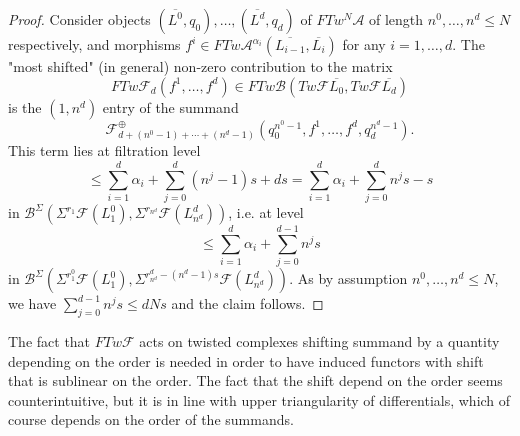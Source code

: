 \begin{proof}
	Consider objects $(\overline{L^0},q_0),\ldots, (\overline{L^d},q_d)$ of $FTw^N\mathcal{A}$ of length $n^0,\ldots, n^d\leq N$ respectively, and morphisms $f^i\in FTw\mathcal{A}^{\alpha_i}(\overline{L_{i-1}},\overline{L_i})$ for any $i=1,\ldots,d$. The "most shifted" (in general) non-zero contribution to the matrix $$FTw\mathcal{F}_d(f^1,\ldots, f^d)\in FTw\mathcal{B}(Tw\mathcal{F}\overline{L_0},Tw\mathcal{F}\overline{L_d})$$ is the $(1,n^d)$ entry of the summand $$\mathcal{F}^\oplus_{d + (n^0-1)+\cdots + (n^d-1)}(q_0^{n^0-1},f^1,\ldots, f^d,q_d^{n^d-1}).$$
	This term lies at filtration level $$\leq \sum_{i=1}^d\alpha_i + \sum_{j=0}^d(n^j-1)s+ds = \sum_{i=1}^d\alpha_i + \sum_{j=0}^dn^js-s$$ in $\mathcal{B}^\Sigma(\Sigma^{r_1}\mathcal{F}(L^0_1),\Sigma^{r_{n^d}}\mathcal{F}(L^d_{n^d}))$, i.e. at level $$\leq \sum_{i=1}^d\alpha_i + \sum_{j=0}^{d-1}n^js$$ in 
	$\mathcal{B}^\Sigma(\Sigma^{r^0_1}\mathcal{F}(L^0_1),\Sigma^{r^d_{n^d}-(n^d-1)s}\mathcal{F}(L^d_{n^d}))$. As by assumption $n^0,\ldots, n^d\leq N$, we have $\sum_{j=0}^{d-1}n^js\leq dNs$ and the claim follows.
	
\end{proof}
\begin{rem}
	The fact that $FTw\mathcal{F}$ acts on twisted complexes shifting summand by a quantity depending on the order is needed in order to have induced functors with shift that is sublinear on the order. The fact that the shift depend on the order seems counterintuitive, but it is in line with upper triangularity of differentials, which of course depends on the order of the summands.
\end{rem}

